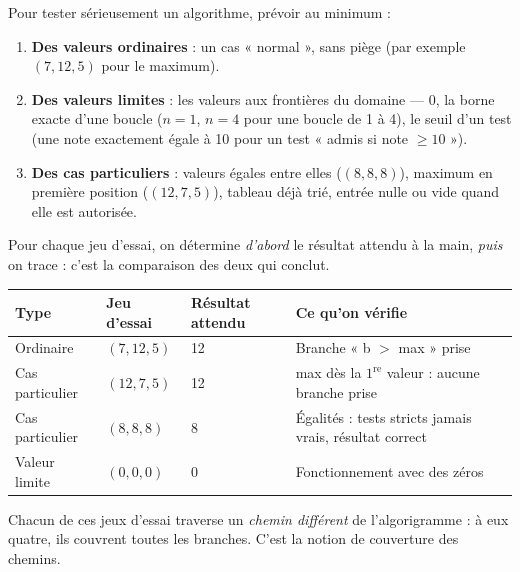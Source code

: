 \documentclass[11pt]{article}
\newcommand{\cle}[1]{{\popxbold\color{popdark}#1}}
\begin{document}
\begin{methode}
Pour tester sérieusement un algorithme, prévoir au minimum :
\begin{enumerate}
\item \textbf{Des valeurs ordinaires} : un cas « normal », sans piège (par exemple $(7, 12, 5)$ pour le maximum).
\item \textbf{Des valeurs limites} : les valeurs aux frontières du domaine — $0$, la borne exacte d'une boucle ($n = 1$, $n = 4$ pour une boucle de 1 à 4), le seuil d'un test (une note exactement égale à 10 pour un test « admis si note $\geq 10$ »).
\item \textbf{Des cas particuliers} : valeurs égales entre elles ($(8, 8, 8)$), maximum en première position ($(12, 7, 5)$), tableau déjà trié, entrée nulle ou vide quand elle est autorisée.
\end{enumerate}
Pour chaque jeu d'essai, on détermine \emph{d'abord} le résultat attendu à la main, \emph{puis} on trace : c'est la comparaison des deux qui conclut.
\end{methode}

\begin{exemplebox}
\begin{center}
\begin{tabularx}{\linewidth}{|l|X|X|l|}
\hline
\rowcolor{popgoldL} \textbf{Type} & \textbf{Jeu d'essai} & \textbf{Résultat attendu} & \textbf{Ce qu'on vérifie} \\
\hline
Ordinaire & $(7, 12, 5)$ & 12 & Branche « b $>$ max » prise \\
\hline
Cas particulier & $(12, 7, 5)$ & 12 & max dès la $1^{\text{re}}$ valeur : aucune branche prise \\
\hline
Cas particulier & $(8, 8, 8)$ & 8 & Égalités : tests stricts jamais vrais, résultat correct \\
\hline
Valeur limite & $(0, 0, 0)$ & 0 & Fonctionnement avec des zéros \\
\hline
\end{tabularx}
\end{center}
Chacun de ces jeux d'essai traverse un \emph{chemin différent} de l'algorigramme : à eux quatre, ils couvrent toutes les branches. C'est la notion de \cle{couverture des chemins}.
\end{exemplebox}
\end{document}
